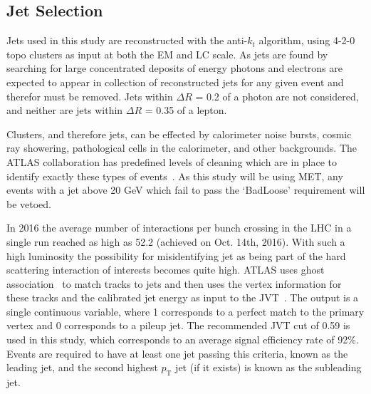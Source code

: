 \subsection{Jet Selection}
Jets used in this study are reconstructed with the anti-$k_t$ algorithm, using 4-2-0 topo clusters as input at both the EM and LC scale.  
As jets are found by searching for large concentrated deposits of energy photons and electrons are expected to appear in collection of reconstructed jets for any given event and therefor must be removed.  
Jets within $\Delta R$ = 0.2 of a photon are not considered, and neither are jets within $\Delta R$ = 0.35 of a lepton.  

Clusters, and therefore jets, can be effected by calorimeter noise bursts, cosmic ray showering, pathological cells in the calorimeter, and other backgrounds.  
The ATLAS collaboration has predefined levels of cleaning which are in place to identify exactly these types of events~\cite{ATLAS-CONF-2015-029}.  
As this study will be using MET, any events with a jet above 20 GeV which fail to pass the `BadLoose' requirement will be vetoed.  

In 2016 the average number of interactions per bunch crossing in the LHC in a single run reached as high as 52.2 (achieved on Oct. 14th, 2016).  
With such a high luminosity the possibility for misidentifying jet as being part of the hard scattering interaction of interests becomes quite high.  
ATLAS uses ghost association~\cite{ATLAS-CONF-2013-083} to match tracks to jets and then uses the vertex information for these tracks and the calibrated jet energy as input to the \gls{JVT}~\cite{ATLAS-CONF-2014-018}.  
The output is a single continuous variable, where 1 corresponds to a perfect match to the primary vertex and 0 corresponds to a pileup jet.  
The recommended JVT cut of 0.59 is used in this study, which corresponds to an average signal efficiency rate of 92\%.  
Events are required to have at least one jet passing this criteria, known as the leading jet, and the second highest $p_{\mathrm T}$ jet (if it exists) is known as the subleading jet.  


